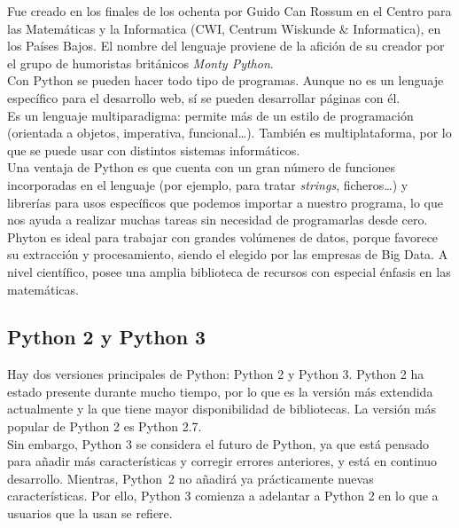 \documentclass[a4paper, 12pt]{book}
\begin{document}
Fue creado en los finales de los ochenta por Guido Can Rossum en el Centro para las Matemáticas y la Informatica (CWI, Centrum Wiskunde \& Informatica), en los Países Bajos. El nombre del lenguaje proviene de la afición de su creador por el grupo de humoristas británicos \textit{Monty Python}.\\

Con Python se pueden hacer todo tipo de programas. Aunque no es un lenguaje específico para el desarrollo web, sí se pueden desarrollar páginas con él.\\

Es un lenguaje multiparadigma: permite más de un estilo de programación (orientada a objetos, imperativa, funcional\ldots). También es multiplataforma, por lo que se puede usar con distintos sistemas informáticos.\\

Una ventaja de Python es que cuenta con un gran número de funciones incorporadas en el lenguaje (por ejemplo, para tratar \emph{strings}, ficheros\ldots) y librerías para usos específicos que podemos importar a nuestro programa, lo que nos ayuda a realizar muchas tareas sin necesidad de programarlas desde cero.\\

Phyton es ideal para trabajar con grandes volúmenes de datos, porque favorece su extracción y procesamiento, siendo el elegido por las empresas de Big Data. A nivel científico, posee una amplia biblioteca de recursos con especial énfasis en las matemáticas.


\subsection{Python 2 y Python 3}
\label{python2y3}
Hay dos versiones principales de Python: Python 2 y Python 3. Python 2 ha estado presente durante mucho tiempo, por lo que es la versión más extendida actualmente y la que tiene mayor disponibilidad de bibliotecas. La versión más popular de Python 2 es Python 2.7.\\

Sin embargo, Python 3 se considera el futuro de Python, ya que está pensado para añadir más características y corregir errores anteriores, y está en continuo desarrollo. Mientras, Python~2 no añadirá ya prácticamente nuevas características. Por ello, Python 3 comienza a adelantar a Python 2 en lo que a usuarios que la usan se refiere.\\
\end{document}
